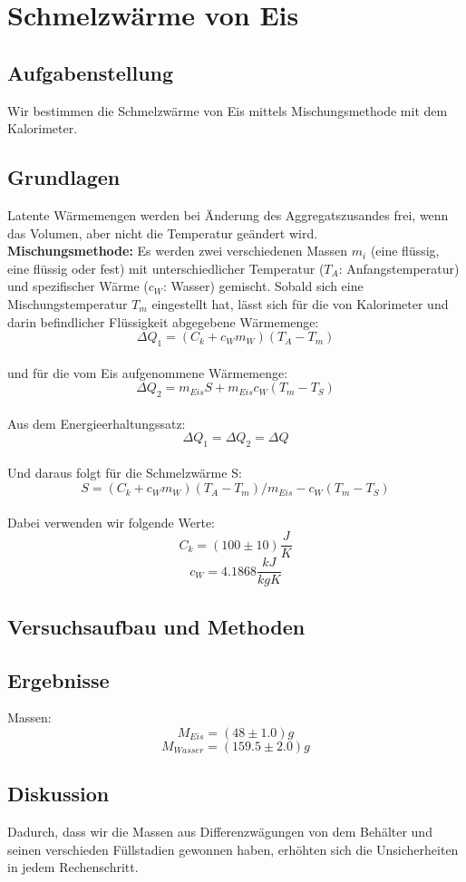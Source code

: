 \documentclass{article}
\begin{document}
\section{Schmelzwärme von Eis}
\subsection{Aufgabenstellung}
Wir bestimmen die Schmelzwärme von Eis mittels Mischungsmethode mit dem Kalorimeter.
\subsection{Grundlagen}
Latente Wärmemengen werden bei Änderung des Aggregatszusandes frei, wenn das Volumen, aber nicht die Temperatur geändert wird. \\
\textbf{Mischungsmethode:}
Es werden zwei verschiedenen Massen $m_i$ (eine flüssig, eine flüssig oder fest) mit unterschiedlicher Temperatur ($T_A$: Anfangstemperatur) und spezifischer Wärme ($c_W$: Wasser) gemischt. Sobald sich eine Mischungstemperatur $T_m$ eingestellt hat, lässt sich für die von Kalorimeter und darin befindlicher Flüssigkeit abgegebene Wärmemenge:
$$\Delta Q_1=(C_k + c_W m_W)(T_A - T_m)$$
\\
und für die vom Eis aufgenommene Wärmemenge:
$$\Delta Q_2=m_{Eis} S + m_{Eis} c_W (T_m - T_S)$$
\\
Aus dem Energieerhaltungssatz:
$$\Delta Q_1=\Delta Q_2=\Delta Q$$
\\
Und daraus folgt für die Schmelzwärme S:
$$S=(C_k+c_W m_W)(T_A-T_m) / m_{Eis} - c_W(T_m-T_S)$$
\\
Dabei verwenden wir folgende Werte: 
$$C_k=(100 \pm 10)\frac{J}{K}$$
$$c_W =4.1868 \frac{kJ}{kg K}$$
\subsection{Versuchsaufbau und Methoden}

\subsection{Ergebnisse}
Massen:
$$M_{Eis}= (48 \pm 1.0)g$$
$$M_{Wasser} = (159.5 \pm 2.0)g$$

\subsection{Diskussion}
Dadurch, dass wir die Massen aus Differenzwägungen von dem Behälter und seinen verschieden Füllstadien gewonnen haben, erhöhten sich die Unsicherheiten in jedem Rechenschritt.
\end{document}
